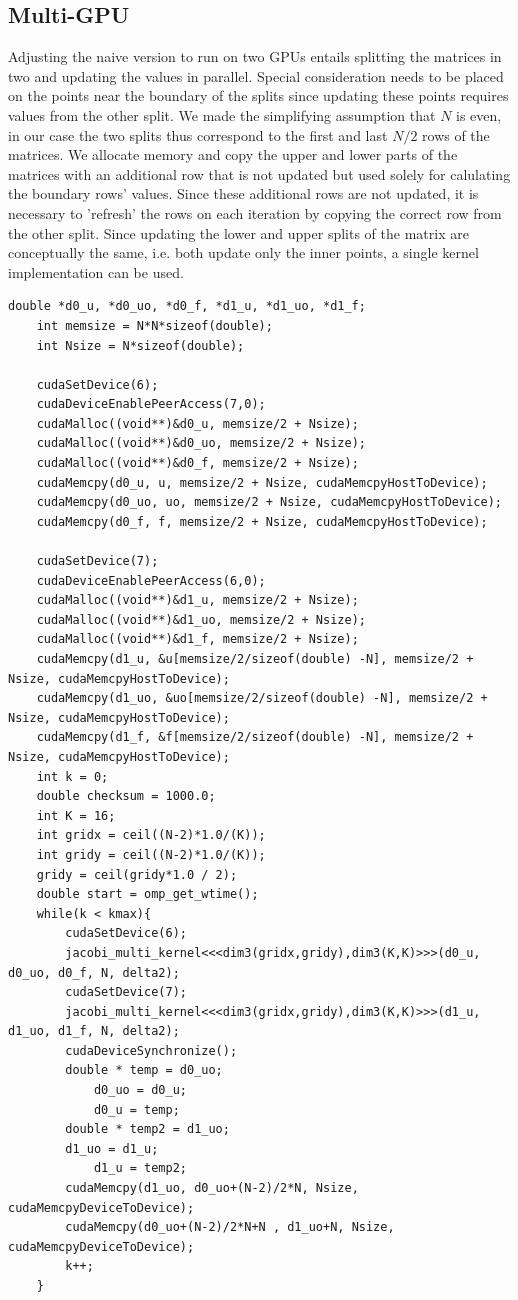 \subsection{Multi-GPU}
Adjusting the naive version to run on two GPUs entails splitting the matrices in two and updating the values in parallel. Special consideration needs to be placed on the points near the boundary of the splits since updating these points requires values from the other split. We made the simplifying assumption that $N$ is even, in our case the two splits thus correspond to the first and last $N/2$ rows of the matrices. We allocate memory and copy the upper and lower parts of the matrices with an additional row that is not updated but used solely for calulating the boundary rows' values.
Since these additional rows are not updated, it is necessary to 'refresh' the rows on each iteration by copying the correct row from the other split. Since updating the lower and upper splits of the matrix are conceptually the same, i.e. both update only the inner points, a single kernel implementation can be used.


\begin{lstlisting}
double *d0_u, *d0_uo, *d0_f, *d1_u, *d1_uo, *d1_f;
	int memsize = N*N*sizeof(double);
	int Nsize = N*sizeof(double);

	cudaSetDevice(6);
	cudaDeviceEnablePeerAccess(7,0);
	cudaMalloc((void**)&d0_u, memsize/2 + Nsize);
	cudaMalloc((void**)&d0_uo, memsize/2 + Nsize);
	cudaMalloc((void**)&d0_f, memsize/2 + Nsize);
	cudaMemcpy(d0_u, u, memsize/2 + Nsize, cudaMemcpyHostToDevice);
	cudaMemcpy(d0_uo, uo, memsize/2 + Nsize, cudaMemcpyHostToDevice);
	cudaMemcpy(d0_f, f, memsize/2 + Nsize, cudaMemcpyHostToDevice);

	cudaSetDevice(7); 
	cudaDeviceEnablePeerAccess(6,0);
	cudaMalloc((void**)&d1_u, memsize/2 + Nsize);
	cudaMalloc((void**)&d1_uo, memsize/2 + Nsize);
	cudaMalloc((void**)&d1_f, memsize/2 + Nsize);
	cudaMemcpy(d1_u, &u[memsize/2/sizeof(double) -N], memsize/2 + Nsize, cudaMemcpyHostToDevice);
	cudaMemcpy(d1_uo, &uo[memsize/2/sizeof(double) -N], memsize/2 + Nsize, cudaMemcpyHostToDevice);
	cudaMemcpy(d1_f, &f[memsize/2/sizeof(double) -N], memsize/2 + Nsize, cudaMemcpyHostToDevice);
	int k = 0;
	double checksum = 1000.0;	
	int K = 16;
	int gridx = ceil((N-2)*1.0/(K));
 	int gridy = ceil((N-2)*1.0/(K));
	gridy = ceil(gridy*1.0 / 2);
	double start = omp_get_wtime(); 
	while(k < kmax){
		cudaSetDevice(6);
		jacobi_multi_kernel<<<dim3(gridx,gridy),dim3(K,K)>>>(d0_u, d0_uo, d0_f, N, delta2);
		cudaSetDevice(7);
		jacobi_multi_kernel<<<dim3(gridx,gridy),dim3(K,K)>>>(d1_u, d1_uo, d1_f, N, delta2);
		cudaDeviceSynchronize();
		double * temp = d0_uo;
    		d0_uo = d0_u;
    		d0_u = temp;
		double * temp2 = d1_uo;
		d1_uo = d1_u;
    		d1_u = temp2;
		cudaMemcpy(d1_uo, d0_uo+(N-2)/2*N, Nsize, cudaMemcpyDeviceToDevice);
		cudaMemcpy(d0_uo+(N-2)/2*N+N , d1_uo+N, Nsize, cudaMemcpyDeviceToDevice);
		k++;
	}
\end{lstlisting}


